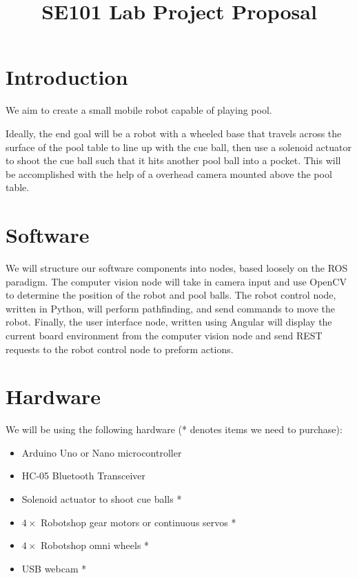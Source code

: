 \documentclass[11pt]{article}
\title{SE101 Lab Project Proposal \vspace{-12pt}}
\author{Ethan Guo, Atif Mahmud \hskip 5em 11 October 2018}
\date{\vspace{-12pt}}
\begin{document}

\maketitle
\vspace{-0.625in}

\section*{Introduction}

We aim to create a small mobile robot capable of playing pool.

Ideally, the end goal will be a robot with a wheeled base that travels across the surface of the pool table to line up with the cue ball, then use a solenoid actuator to shoot the cue ball such that it hits another pool ball into a pocket. This will be accomplished with the help of a overhead camera mounted above the pool table. 

\section*{Software}

We will structure our software components into nodes, based loosely on the ROS paradigm. The computer vision node will take in camera input and use OpenCV to determine the position of the robot and pool balls. The robot control node, written in Python, will perform pathfinding, and send commands to move the robot. Finally, the user interface node, written using Angular will display the current board environment from the computer vision node and send REST requests to the robot control node to preform actions.

\section*{Hardware}

We will be using the following hardware (* denotes items we need to purchase):
\begin{itemize}
    \setlength{\itemsep}{0pt} %
    \setlength{\parskip}{0pt} %
    \setlength{\parsep}{0pt} %
    \vspace{-0.125in}
    \item Arduino Uno or Nano microcontroller
    \item HC-05 Bluetooth Transceiver
    \item Solenoid actuator to shoot cue balls *
    \item $4 \times$ Robotshop gear motors or continuous servos *
    \item $4 \times$ Robotshop omni wheels *
    \item USB webcam *
\end{itemize}
\end{document}
